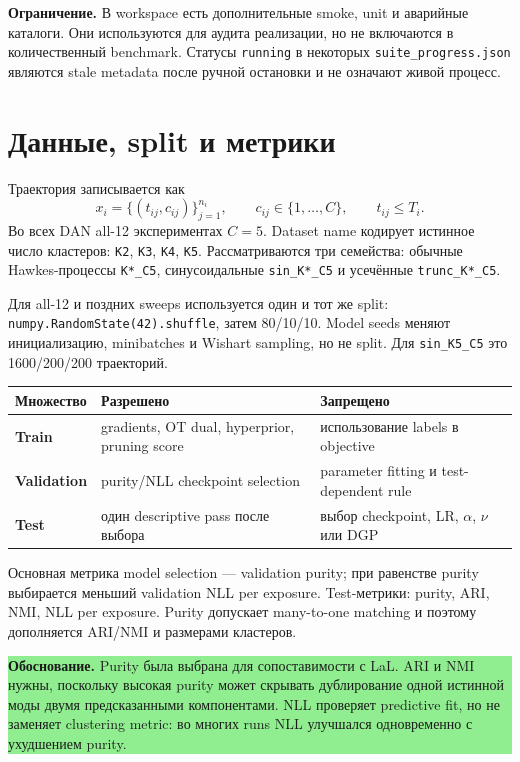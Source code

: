 \documentclass[11pt,a4paper]{article}
\newcommand{\code}[1]{\texttt{#1}}
\newcommand{\boxnote}[2]{%
  \begin{center}\setlength{\fboxsep}{9pt}%
  \colorbox{#1}{\begin{minipage}{0.94\textwidth}\raggedright #2\par\end{minipage}}
  \end{center}}
\newcommand{\rationale}[1]{\boxnote{lightgreen}{\textbf{Обоснование.} #1}}
\newcommand{\caveat}[1]{\boxnote{lightamber}{\textbf{Ограничение.} #1}}
\begin{document}
\caveat{В workspace есть дополнительные smoke, unit и аварийные каталоги.
Они используются для аудита реализации, но не включаются в количественный
benchmark. Статусы \code{running} в некоторых \code{suite\_progress.json}
являются stale metadata после ручной остановки и не означают живой процесс.}

\section{Данные, split и метрики}

Траектория записывается как
\[
x_i=\{(t_{ij},c_{ij})\}_{j=1}^{n_i},\qquad c_{ij}\in\{1,\ldots,C\},
\qquad t_{ij}\le T_i.
\]
Во всех DAN all-12 экспериментах $C=5$. Dataset name кодирует истинное число
кластеров: \code{K2}, \code{K3}, \code{K4}, \code{K5}. Рассматриваются три
семейства: обычные Hawkes-процессы \code{K*\_C5}, синусоидальные
\code{sin\_K*\_C5} и усечённые \code{trunc\_K*\_C5}.

Для all-12 и поздних sweeps используется один и тот же split:
\code{numpy.RandomState(42).shuffle}, затем 80/10/10. Model seeds меняют
инициализацию, minibatches и Wishart sampling, но не split. Для
\code{sin\_K5\_C5} это 1600/200/200 траекторий.

\begin{center}
\begin{tabularx}{\textwidth}{>{\bfseries}p{}X X}
\toprule
Множество & Разрешено & Запрещено \\
\midrule
Train & gradients, OT dual, hyperprior, pruning score & использование labels в objective \\
Validation & purity/NLL checkpoint selection & parameter fitting и test-dependent rule \\
Test & один descriptive pass после выбора & выбор checkpoint, LR, $\alpha$, $\nu$ или DGP \\
\bottomrule
\end{tabularx}
\end{center}

Основная метрика model selection --- validation purity; при равенстве purity
выбирается меньший validation NLL per exposure. Test-метрики: purity, ARI, NMI,
NLL per exposure. Purity допускает many-to-one matching и поэтому дополняется
ARI/NMI и размерами кластеров.

\rationale{Purity была выбрана для сопоставимости с LaL. ARI и NMI нужны,
поскольку высокая purity может скрывать дублирование одной истинной моды двумя
предсказанными компонентами. NLL проверяет predictive fit, но не заменяет
clustering metric: во многих runs NLL улучшался одновременно с ухудшением
purity.}
\end{document}
